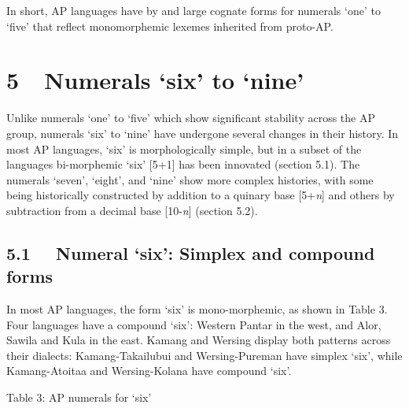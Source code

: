 In short, AP languages have by and large cognate forms for numerals {\textquoteleft}one{\textquoteright} to {\textquoteleft}five{\textquoteright} that reflect monomorphemic lexemes inherited from proto-AP. 

\section[5\ \ Numerals {\textquoteleft}six{\textquoteright} to {\textquoteleft}nine{\textquoteright}]{5\ \ Numerals {\textquoteleft}six{\textquoteright} to {\textquoteleft}nine{\textquoteright}}
Unlike numerals {\textquoteleft}one{\textquoteright} to {\textquoteleft}five{\textquoteright} which show significant stability across the AP group, numerals {\textquoteleft}six{\textquoteright} to {\textquoteleft}nine{\textquoteright} have undergone several changes in their history. In most AP languages, {\textquoteleft}six{\textquoteright} is morphologically simple, but in a subset of the languages bi-morphemic {\textquoteleft}six{\textquoteright} [5+1] has been innovated (section 5.1). The numerals {\textquoteleft}seven{\textquoteright}, {\textquoteleft}eight{\textquoteright}, and {\textquoteleft}nine{\textquoteright} show more complex histories, with some being historically constructed by addition to a quinary base [5+\textit{n}] and others by subtraction from a decimal base [10-\textit{n}] (section 5.2). 

\subsection[5.1 \ \ Numeral {\textquoteleft}six{\textquoteright}: Simplex and compound forms ]{5.1 \ \ Numeral {\textquoteleft}six{\textquoteright}: Simplex and compound forms }
In most AP languages, the form {\textquoteleft}six{\textquoteright} is mono-morphemic, as shown in Table 3. Four languages have a compound {\textquoteleft}six{\textquoteright}: Western Pantar in the west, and Alor, Sawila and Kula in the east. Kamang and Wersing display both patterns across their dialects: Kamang-Takailubui and Wersing-Pureman have simplex {\textquoteleft}six{\textquoteright}, while Kamang-Atoitaa and Wersing-Kolana have compound {\textquoteleft}six{\textquoteright}. 

{\centering
Table 3: AP numerals for {\textquoteleft}six{\textquoteright} 
\par}

